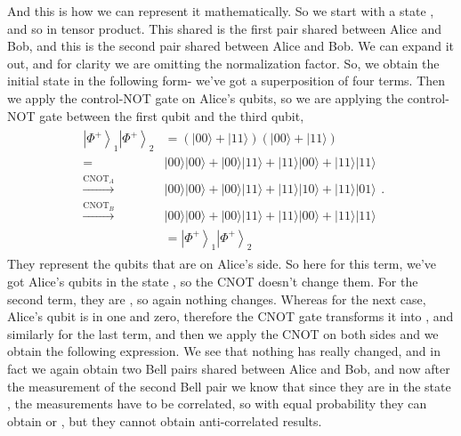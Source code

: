 And this is how we can represent it mathematically. So we start with a state \ket{\Psi^+}, and \ket{\Psi^+} so in tensor product. This \ket{\Psi^+} shared is the first pair shared between Alice and Bob, and this is the second pair shared between Alice and Bob. We can expand it out, and for clarity we are omitting the normalization factor. So, we obtain the initial state in the following form- we've got a superposition of four terms. Then we apply the control-NOT gate on Alice's qubits, so we are applying the control-NOT gate between the first qubit and the third qubit,
\begin{align}
    \begin{aligned}
\left|\Phi^{+}\right\rangle_{1}\left|\Phi^{+}\right\rangle_{2} &=(|00\rangle+|11\rangle)(|00\rangle+|11\rangle) \\
=&|00\rangle|00\rangle+|00\rangle|11\rangle+|11\rangle|00\rangle+|11\rangle|11\rangle \\
\stackrel{\mathrm{CNOT}_{A}}{\longrightarrow} &|00\rangle|00\rangle+|00\rangle|11\rangle+|11\rangle|10\rangle+|11\rangle|01\rangle \\
\stackrel{\mathrm{CNOT}_{B}}{\longrightarrow} &|00\rangle|00\rangle+|00\rangle|11\rangle+|11\rangle|00\rangle+|11\rangle|11\rangle \\
&=\left|\Phi^{+}\right\rangle_{1}\left|\Phi^{+}\right\rangle_{2}
\end{aligned}.
\end{align}
They represent the qubits that are on Alice's side. So here for this term, we've got Alice's qubits in the state , so the CNOT doesn't change them. For the second term, they are , so again nothing changes. Whereas for the next case, Alice's qubit is in one and zero, therefore the CNOT gate transforms it into , and similarly for the last term, and then we apply the CNOT on both sides and we obtain the following expression. We see that nothing has really changed, and in fact we again obtain two Bell pairs shared between Alice and Bob, and now after the measurement of the second Bell pair we know that since they are in the state  \ket{\Phi^+}, the measurements have to be correlated, so with equal probability they can obtain  or , but they cannot obtain anti-correlated results.

